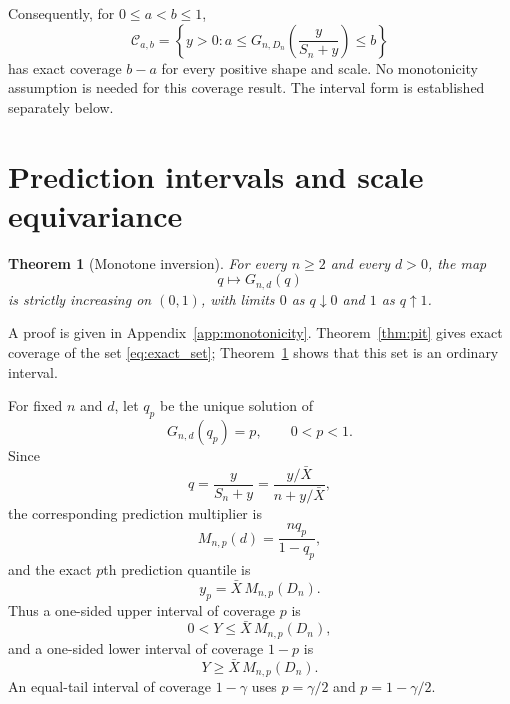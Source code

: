 \documentclass[11pt]{article}
\newtheorem{theorem}{Theorem}[section]
\theoremstyle{remark}
\begin{document}
Consequently, for $0\le a<b\le1$,
\begin{equation}
 \mathcal C_{a,b}
 =\left\{y>0:
 a\le G_{n,D_n}\!\left(\frac{y}{S_n+y}\right)\le b\right\}
 \label{eq:exact_set}
\end{equation}
has exact coverage $b-a$ for every positive shape and scale. No monotonicity assumption is needed for this coverage result. The interval form is established separately below.

\section{Prediction intervals and scale equivariance}

\begin{theorem}[Monotone inversion]
\label{thm:monotonicity}
For every $n\ge2$ and every $d>0$, the map
\[
 q\longmapsto G_{n,d}(q)
\]
is strictly increasing on $(0,1)$, with limits $0$ as $q\downarrow0$ and $1$ as $q\uparrow1$.
\end{theorem}

A proof is given in Appendix~\ref{app:monotonicity}. Theorem~\ref{thm:pit} gives exact coverage of the set \eqref{eq:exact_set}; Theorem~\ref{thm:monotonicity} shows that this set is an ordinary interval.

For fixed $n$ and $d$, let $q_p$ be the unique solution of
\begin{equation}
 G_{n,d}(q_p)=p,
 \qquad 0<p<1.
 \label{eq:q_quantile}
\end{equation}
Since
\begin{equation}
 q=\frac{y}{S_n+y}
   =\frac{y/\bar X}{n+y/\bar X},
 \label{eq:q_z}
\end{equation}
the corresponding prediction multiplier is
\begin{equation}
 M_{n,p}(d)=\frac{nq_p}{1-q_p},
 \label{eq:multiplier}
\end{equation}
and the exact $p$th prediction quantile is
\begin{equation}
 y_p=\bar X\,M_{n,p}(D_n).
 \label{eq:quantile_multiplier}
\end{equation}
Thus a one-sided upper interval of coverage $p$ is
\begin{equation}
 0<Y\le \bar X\,M_{n,p}(D_n),
 \label{eq:upper_interval}
\end{equation}
and a one-sided lower interval of coverage $1-p$ is
\begin{equation}
 Y\ge \bar X\,M_{n,p}(D_n).
 \label{eq:lower_interval}
\end{equation}
An equal-tail interval of coverage $1-\gamma$ uses $p=\gamma/2$ and $p=1-\gamma/2$.
\end{document}
